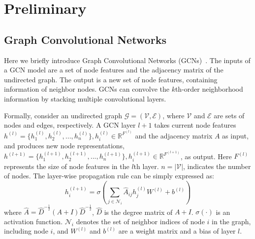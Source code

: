 	
%	
	
	\section{Preliminary}
	
	\subsection*{Graph Convolutional Networks}
	\label{section:Graph Convolutional Networks}
	Here we briefly introduce Graph Convolutional Networks (GCNs)~\cite{Kipf2016Semi}. The inputs of a GCN model are a set of node features and the adjacency matrix of the undirected graph. The output is a new set of node features, containing information of neighbor nodes. GCNs can convolve the $k$th-order neighborhood information by stacking multiple convolutional layers.
	
	Formally, consider an undirected graph $\mathcal{G}=(\mathcal{V},\mathcal{E})$, where $\mathcal{V}$ and $\mathcal{E}$ are sets of nodes and edges, respectively. A GCN layer $l+1$ takes current node features $h^{(l)}=\{h_1^{(l)},h_2^{(l)},...,h_n^{(l)}\}, h_i^{(l)} \in \mathbb{R}^{F^{(l)}}$ and the adjacency matrix $A$ as input, and produces new node representations, $h^{(l+1)}=\{h_1^{(l+1)},h_2^{(l+1)},...,h_n^{(l+1)}\}, h_i^{(l+1)} \in \mathbb{R}^{F^{(l+1)}}$, as output. Here $F^{(l)}$ represents the size of node features in the $l$th layer. $n=|\mathcal{V}|$, indicates the number of nodes. The layer-wise propagation rule can be simply expressed as:
	\begin{equation}
		h_i^{(l+1)}=\sigma (\sum_{j \in \mathcal{N}_i}\hat A_{ij}h_j^{(l)}W^{(l)}+b^{(l)})
	\end{equation}
	where $\hat A=\hat D^{- \frac{1}{2}}(A+I)\hat D^{- \frac{1}{2}}$, $\hat D$ is the degree matrix of $A+I$. $\sigma(\cdot)$ is an activation function. $\mathcal{N}_i$ denotes the set of neighbor indices of node $i$ in the graph, including node $i$, and $W^{(l)}$ and $b^{(l)}$ are a weight matrix and a bias of layer $l$.
	
